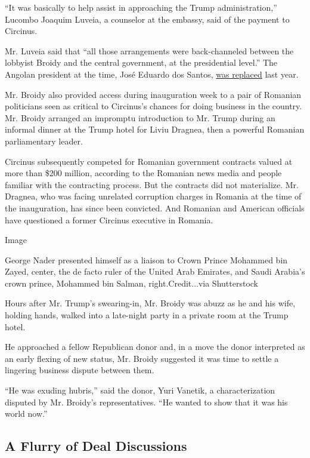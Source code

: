 ``It was basically to help assist in approaching the Trump
administration,'' Lucombo Joaquim Luveia, a counselor at the embassy,
said of the payment to Circinus.

Mr. Luveia said that ``all those arrangements were back-channeled
between the lobbyist Broidy and the central government, at the
presidential level.'' The Angolan president at the time, José Eduardo
dos Santos,
\href{https://www.nytimes.com/2018/09/08/world/africa/angola-dos-santos.html}{was
replaced} last year.

Mr. Broidy also provided access during inauguration week to a pair of
Romanian politicians seen as critical to Circinus's chances for doing
business in the country. Mr. Broidy arranged an impromptu introduction
to Mr. Trump during an informal dinner at the Trump hotel for Liviu
Dragnea, then a powerful Romanian parliamentary leader.

Circinus subsequently competed for Romanian government contracts valued
at more than \$200 million, according to the Romanian news media and
people familiar with the contracting process. But the contracts did not
materialize. Mr. Dragnea, who was facing unrelated corruption charges in
Romania at the time of the inauguration, has since been convicted. And
Romanian and American officials have questioned a former Circinus
executive in Romania.

Image

George Nader presented himself as a liaison to Crown Prince Mohammed bin
Zayed, center, the de facto ruler of the United Arab Emirates, and Saudi
Arabia's crown prince, Mohammed bin Salman, right.Credit...via
Shutterstock

Hours after Mr. Trump's swearing-in, Mr. Broidy was abuzz as he and his
wife, holding hands, walked into a late-night party in a private room at
the Trump hotel.

He approached a fellow Republican donor and, in a move the donor
interpreted as an early flexing of new status, Mr. Broidy suggested it
was time to settle a lingering business dispute between them.

``He was exuding hubris,'' said the donor, Yuri Vanetik, a
characterization disputed by Mr. Broidy's representatives. ``He wanted
to show that it was his world now.''

\hypertarget{a-flurry-of-deal-discussions}{%
\subsection{A Flurry of Deal
Discussions}\label{a-flurry-of-deal-discussions}}

